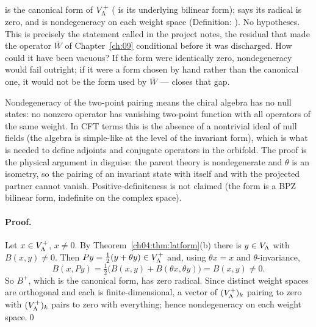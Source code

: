 \begin{dictionary}
 is the canonical form of $V_{\Lambda}^+$ ( is its underlying bilinear
form);  says its radical is zero, and  is
nondegeneracy on each weight space (Definition: ). No hypotheses. This is
precisely the statement called  in the project notes, the residual that made the operator
$\overline W$ of Chapter~\ref{ch:09} conditional before it was discharged. How could it have been
vacuous? If the form were identically zero, nondegeneracy would fail outright; if it were a form
chosen by hand rather than the canonical one, it would not be the form used by $\overline W$ ---
 closes that gap.
\end{dictionary}

\begin{physics}
Nondegeneracy of the two-point pairing means the chiral algebra has no null states: no nonzero operator has vanishing two-point function with all operators of the same weight. In CFT terms this is the absence of a nontrivial ideal of null fields (the algebra is simple-like at the level of the invariant form), which is what is needed to define adjoints and conjugate operators in the orbifold. The proof is the physical argument in disguise: the parent theory is nondegenerate and $\theta$ is an isometry, so the pairing of an invariant state with itself and with the projected partner cannot vanish. Positive-definiteness is not claimed (the form is a BPZ bilinear form, indefinite on the complex space).
\end{physics}

\paragraph{Proof.} Let $x\in V_{\Lambda}^+$, $x\neq0$. By Theorem~\ref{ch04:thm:latform}(b) there is $y\in V_{\Lambda}$
with $B(x,y)\neq0$. Then $Py=\tfrac12(y+\theta y)\in V_{\Lambda}^+$ and, using $\theta x=x$ and
$\theta$-invariance,
\begin{equation*}
  B(x,Py)=\tfrac12\big(B(x,y)+B(\theta x,\theta y)\big)=B(x,y)\neq0 .
\end{equation*}
So $B^+$, which is the canonical form, has zero radical. Since distinct weight spaces are orthogonal
and each is finite-dimensional, a vector of $(V_{\Lambda}^+)_k$ pairing to zero with $(V_{\Lambda}^+)_k$ pairs
to zero with everything; hence nondegeneracy on each weight space.\qed

